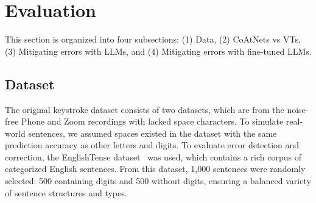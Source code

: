 
\section{Evaluation}
\label{sec:evaluation}

This section is organized into four subsections: (1) Data, (2) CoAtNets vs VTs, (3) Mitigating errors with LLMs, and (4) Mitigating errors with fine-tuned LLMs.

\subsection{Dataset}

The original keystroke dataset consists of two datasets, which are from the noise-free Phone and Zoom recordings with lacked space characters. To simulate real-world sentences, we assumed spaces existed in the dataset with the same prediction accuracy as other letters and digits. To evaluate error detection and correction, the EnglishTense dataset~\cite{ayman2024englishtense} was used, which contains a rich corpus of categorized English sentences. From this dataset, 1,000 sentences were randomly selected: 500 containing digits and 500 without digits, ensuring a balanced variety of sentence structures and types.
\par
\begin{table}[htbp]
\centering
{}
\vspace{0.2em}
\caption{Different noise intensity levels across Phone and Zoom datasets.}
\label{tab:noise_factors}
\end{table}
\par

